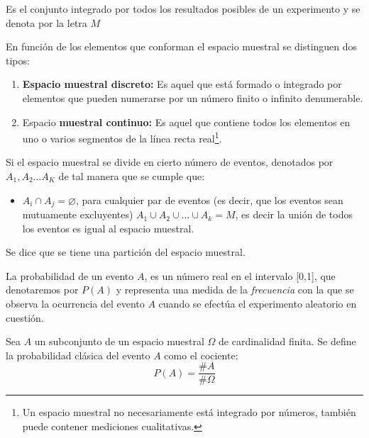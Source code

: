 \begin{definition}
    Es el conjunto integrado por todos los resultados
    posibles de un experimento y se denota por la letra $M$
\end{definition}

En función de los elementos que conforman el
espacio muestral se distinguen dos tipos:


\begin{enumerate}
    \item \textbf{Espacio muestral discreto:} Es aquel que está
          formado o integrado por elementos que pueden
          numerarse por un número finito o infinito
          denumerable.
    \item Espacio \textbf{muestral continuo:} Es aquel que
          contiene todos los elementos en uno o varios
          segmentos de la línea recta real\footnote{Un espacio muestral no necesariamente está
              integrado por números, también puede contener
              mediciones cualitativas.}.
\end{enumerate}

\begin{definition}
    Si el espacio muestral se divide en cierto número de
    eventos, denotados por $A_1,A_2\dots A_K$ de tal manera que se
    cumple que:

    \begin{itemize}
        \item $A_i \cap A_j=\varnothing$, para cualquier par de eventos (es decir, que los
              eventos sean mutuamente excluyentes)
              $A_1 \cup A_2 \cup\dots \cup A_k =M$, es decir la unión de todos los eventos
              es igual al espacio muestral.
    \end{itemize}
    Se dice que se tiene una partición del espacio muestral.
\end{definition}

\begin{definition}[Probabilidad]
    La probabilidad de un evento $A$, es un número real en el intervalo [0,1], que denotaremos por $P(A)$
    y representa una medida de la \textit{frecuencia} con la que se observa la ocurrencia del evento $A$ cuando se efectúa el experimento aleatorio en cuestión.
\end{definition}

\begin{definition}
    Sea $A$ un subconjunto de un espacio muestral $\Omega$ de cardinalidad finita. Se define la probabilidad clásica del evento $A$ como el cociente:
    \begin{equation}
        P(A)=\frac{\#A}{\#\Omega}
    \end{equation}
\end{definition}

